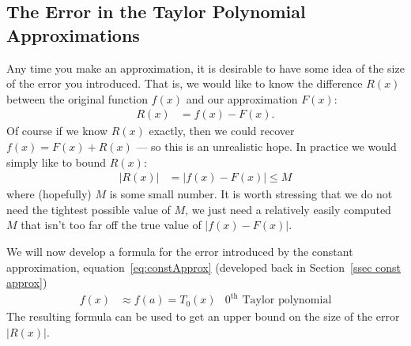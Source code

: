 \goodbreak



\subsection{The Error in the Taylor Polynomial Approximations}\label{ssec taylor error}
Any time you make an approximation, it is desirable to have some idea
of the size of the error you introduced. That is, we would like to know the difference
$R(x)$ between the original function $f(x)$ and our approximation $F(x)$:
\begin{align*}
  R(x) &= f(x)-F(x).
\end{align*}
Of course if we know $R(x)$ exactly, then we could recover $f(x) = F(x)+R(x)$ --- so this
is an unrealistic hope. In practice we would simply like to bound $R(x)$:
\begin{align*}
  |R(x)| &= |f(x)-F(x)| \leq M
\end{align*}
where (hopefully) $M$ is some small number. It is worth stressing that we do not need the
tightest possible value of $M$, we just need a relatively easily computed $M$ that isn't
too far off the true value of $|f(x)-F(x)|$.


We will now develop a formula for the error introduced by the constant approximation,
equation~\eqref{eq:constApprox} (developed back in Section~\ref{ssec const
approx})
\begin{align*}
f(x)&\approx f(a) = T_0(x) & \text{$0^\mathrm{th}$ Taylor polynomial}
\end{align*}
The resulting formula can be used to get an upper bound on the size of the error
$|R(x)|$.


